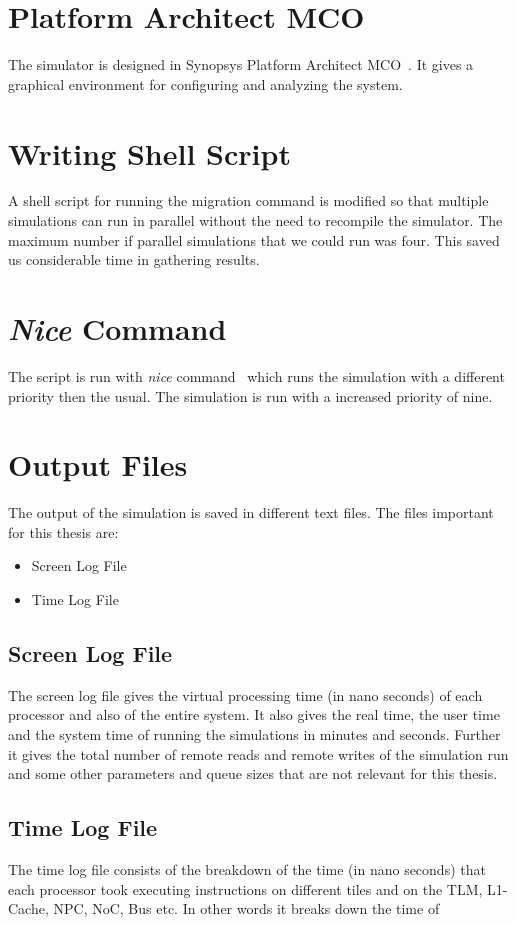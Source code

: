\documentclass{listhesis}
\begin{document}
\section{Platform Architect MCO}
The simulator is designed in Synopsys Platform Architect MCO~\cite{synopsys}. It gives a graphical environment for configuring and analyzing the system. 
\section{Writing Shell Script}
A shell script for running the migration command is modified so that multiple simulations can run in parallel without the need to recompile the simulator. The maximum number if parallel simulations that we could run was four. This saved us considerable time in gathering results. 
\section{\textit{Nice} Command}
The script is run with \textit{nice} command~\cite{nice} which runs the simulation with a different priority then the usual. The simulation is run with a increased priority of nine.
\section{Output Files}
The output of the simulation is saved in different text files. The files important for this thesis are:
\begin{itemize}
\item Screen Log File
\item Time Log File
\end{itemize}
\subsection{Screen Log File}
The screen log file gives the virtual processing time (in nano seconds) of each processor and also of the entire system. It also gives the real time, the user time and the system time of running the simulations in minutes and seconds. Further it gives the total number of remote reads and remote writes of the simulation run and some other parameters and queue sizes that are not relevant for this thesis.\\
\subsection{Time Log File}
The time log file consists of the breakdown of the time (in nano seconds) that each processor took executing instructions on different tiles and on the TLM, L1-Cache, NPC, NoC, Bus etc. In other words it breaks down the time of
\end{document}
